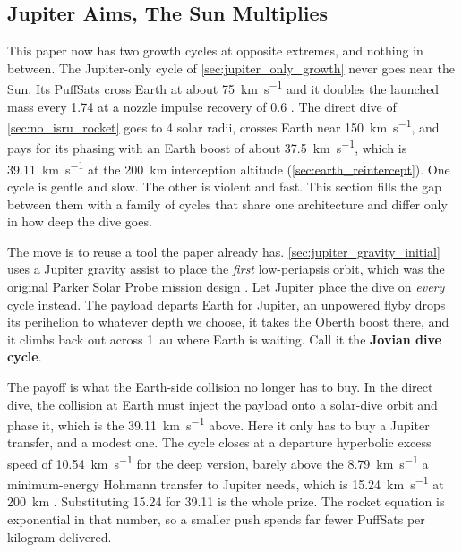 \documentclass{article}
\begin{document}
\subsection{Jupiter Aims, The Sun Multiplies}\label{sec:jovian_dive_cycle}
This paper now has two growth cycles at opposite extremes, and nothing in between. The Jupiter-only cycle of \autoref{sec:jupiter_only_growth} never goes near the Sun. Its PuffSats cross Earth at about \SI{75}{\kilo\meter\per\second} and it doubles the launched mass every \SI{1.74}{\year} at a nozzle impulse recovery of 0.6 \cite{Katz_aim_is_all_you_need_2025}. The direct dive of \autoref{sec:no_isru_rocket} goes to 4 solar radii, crosses Earth near \SI{150}{\kilo\meter\per\second}, and pays for its phasing with an Earth boost of about \SI{37.5}{\kilo\meter\per\second}, which is \SI{39.11}{\kilo\meter\per\second} at the \SI{200}{\kilo\meter} interception altitude (\autoref{sec:earth_reintercept}). One cycle is gentle and slow. The other is violent and fast. This section fills the gap between them with a family of cycles that share one architecture and differ only in how deep the dive goes.

The move is to reuse a tool the paper already has. \autoref{sec:jupiter_gravity_initial} uses a Jupiter gravity assist to place the \emph{first} low-periapsis orbit, which was the original Parker Solar Probe mission design \cite{mccomas2005solar}. Let Jupiter place the dive on \emph{every} cycle instead. The payload departs Earth for Jupiter, an unpowered flyby drops its perihelion to whatever depth we choose, it takes the Oberth boost there, and it climbs back out across \SI{1}{\astronomicalunit} where Earth is waiting. Call it the \textbf{Jovian dive cycle}.

The payoff is what the Earth-side collision no longer has to buy. In the direct dive, the collision at Earth must inject the payload onto a solar-dive orbit and phase it, which is the \SI{39.11}{\kilo\meter\per\second} above. Here it only has to buy a Jupiter transfer, and a modest one. The cycle closes at a departure hyperbolic excess speed of \SI{10.54}{\kilo\meter\per\second} for the deep version, barely above the \SI{8.79}{\kilo\meter\per\second} a minimum-energy Hohmann transfer to Jupiter needs, which is \SI{15.24}{\kilo\meter\per\second} at \SI{200}{\kilo\meter} \cite{Katz_aim_is_all_you_need_2025}. Substituting \num{15.24} for \num{39.11} is the whole prize. The rocket equation is exponential in that number, so a smaller push spends far fewer PuffSats per kilogram delivered.
\end{document}
